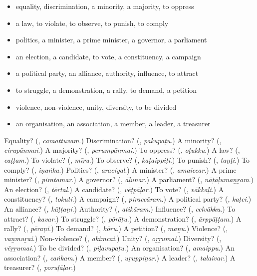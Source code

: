 \begin{itemize}
\raggedright
  \item equality, discrimination, a minority, a majority, to oppress
  \item a law, to violate, to observe, to punish, to comply
  \item politics, a minister, a prime minister, a governor, a parliament
  \item an election, a candidate, to vote, a constituency, a campaign
  \item a political party, an alliance, authority, influence, to attract
  \item to struggle, a demonstration, a rally, to demand, a petition
  \item violence, non-violence, unity, diversity, to be divided
  \item an organisation, an association, a member, a leader, a treasurer
\end{itemize}

\begin{tcolorbox}[breakable,colback=teal!4,colframe=teal!35!black,title={Before you move on}]
Equality? (\textbf{}, \emph{camattuvam}.) Discrimination? (\textbf{}, \emph{pākupāṭu}.) A minority? (\textbf{}, \emph{ciṟupāṉmai}.) A majority? (\textbf{}, \emph{perumpāṉmai}.) To oppress? (\textbf{}, \emph{oṭukku}.) A law? (\textbf{}, \emph{caṭṭam}.) To violate? (\textbf{}, \emph{mīṟu}.) To observe? (\textbf{}, \emph{kaṭaippiṭi}.) To punish? (\textbf{}, \emph{taṇṭi}.) To comply? (\textbf{}, \emph{iṇaṅku}.) Politics? (\textbf{}, \emph{araciyal}.) A minister? (\textbf{}, \emph{amaiccar}.) A prime minister? (\textbf{}, \emph{piratamar}.) A governor? (\textbf{}, \emph{āḷunar}.) A parliament? (\textbf{}, \emph{nāṭāḷumaṉṟam}.) An election? (\textbf{}, \emph{tērtal}.) A candidate? (\textbf{}, \emph{vēṭpāḷar}.) To vote? (\textbf{}, \emph{vākkaḷi}.) A constituency? (\textbf{}, \emph{tokuti}.) A campaign? (\textbf{}, \emph{piraccāram}.) A political party? (\textbf{}, \emph{kaṭci}.) An alliance? (\textbf{}, \emph{kūṭṭaṇi}.) Authority? (\textbf{}, \emph{atikāram}.) Influence? (\textbf{}, \emph{celvākku}.) To attract? (\textbf{}, \emph{kavar}.) To struggle? (\textbf{}, \emph{pōrāṭu}.) A demonstration? (\textbf{}, \emph{ārppāṭṭam}.) A rally? (\textbf{}, \emph{pēraṇi}.) To demand? (\textbf{}, \emph{kōru}.) A petition? (\textbf{}, \emph{maṉu}.) Violence? (\textbf{}, \emph{vaṉmuṟai}.) Non-violence? (\textbf{}, \emph{akimcai}.) Unity? (\textbf{}, \emph{oṟṟumai}.) Diversity? (\textbf{}, \emph{vēṟṟumai}.) To be divided? (\textbf{}, \emph{piḷavupaṭu}.) An organisation? (\textbf{}, \emph{amaippu}.) An association? (\textbf{}, \emph{caṅkam}.) A member? (\textbf{}, \emph{uṟuppiṉar}.) A leader? (\textbf{}, \emph{talaivar}.) A treasurer? (\textbf{}, \emph{poruḷāḷar}.)
\end{tcolorbox}
